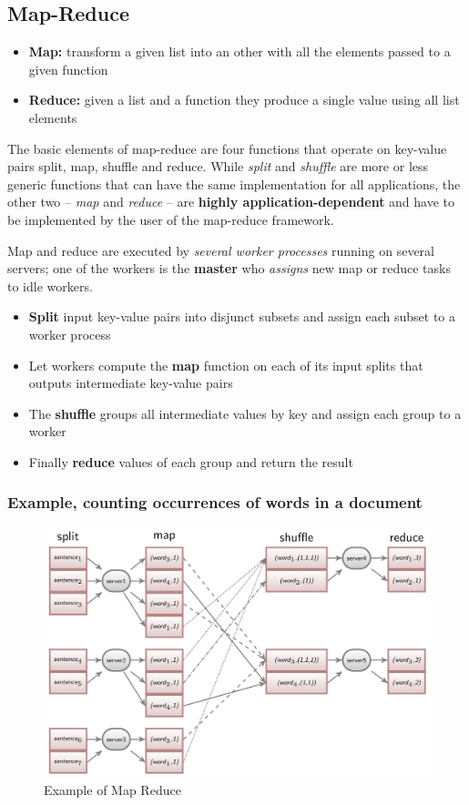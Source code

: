 \subsection{Map-Reduce}
\begin{itemize}
    \item \textbf{Map:} transform a given list into an other with all the elements passed to a given function
    \item \textbf{Reduce:} given a list and a function they produce a single value using all list elements
\end{itemize}
The basic elements of map-reduce are four functions that operate on key-value pairs split, map, shuffle and reduce.
While \textit{split} and \textit{shuffle} are more or less generic functions that can have the same implementation for all applications, the other two – \textit{map} and \textit{reduce} – are \textbf{highly application-dependent} and have to be implemented by the user of the map-reduce framework.

Map and reduce are executed by \textit{several worker processes} running on several servers; one of the workers is the \textbf{master} who \textit{assigns} new map or reduce tasks to idle workers.
\begin{itemize}
    \item \textbf{Split} input key-value pairs into disjunct subsets and assign each subset to a worker process 
    \item Let workers compute the \textbf{map} function on each of its input splits that outputs intermediate key-value pairs
    \item The \textbf{shuffle} groups all intermediate values by key and assign each group to a worker
    \item Finally \textbf{reduce} values of each group and return the result
\end{itemize}

\subsubsection{Example, counting occurrences of words in a document}
\begin{figure}[!hbp]
    \centering
    \includegraphics[width=0.70\linewidth]{images/AdvancedDataManagment/key_value_store/map_reduce.jpeg}
    \caption{Example of Map Reduce}
\end{figure}

